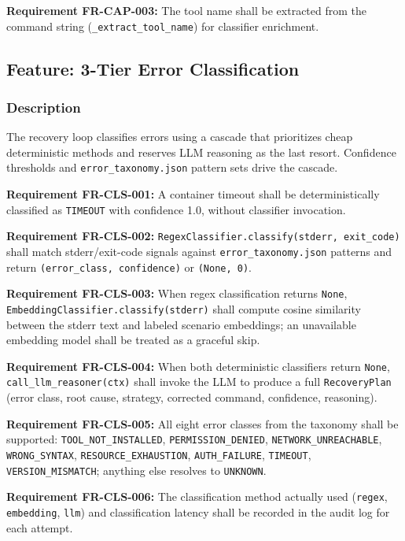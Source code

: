 \documentclass[10pt,journal,onecolumn]{IEEEtran}
\newcommand{\reqid}[1]{\textbf{#1}}
\begin{document}
\reqid{Requirement FR-CAP-003:} The tool name shall be extracted from the command string (\texttt{\_extract\_tool\_name}) for classifier enrichment.

\subsection{Feature: 3-Tier Error Classification}

\subsubsection{Description}

The recovery loop classifies errors using a cascade that prioritizes cheap deterministic methods and reserves LLM reasoning as the last resort. Confidence thresholds and \texttt{error\_taxonomy.json} pattern sets drive the cascade.

\reqid{Requirement FR-CLS-001:} A container timeout shall be deterministically classified as \texttt{TIMEOUT} with confidence 1.0, without classifier invocation.

\reqid{Requirement FR-CLS-002:} \texttt{RegexClassifier.\allowbreak classify(stderr, exit\_\allowbreak code)} shall match stderr/exit-code signals against \texttt{error\_taxonomy.json} patterns and return \texttt{(error\_\allowbreak class, confidence)} or \texttt{(None, 0)}.

\reqid{Requirement FR-CLS-003:} When regex classification returns \texttt{None}, \texttt{EmbeddingClassifier.\allowbreak classify(stderr)} shall compute cosine similarity between the stderr text and labeled scenario embeddings; an unavailable embedding model shall be treated as a graceful skip.

\reqid{Requirement FR-CLS-004:} When both deterministic classifiers return \texttt{None}, \texttt{call\_llm\_reasoner(ctx)} shall invoke the LLM to produce a full \texttt{RecoveryPlan} (error class, root cause, strategy, corrected command, confidence, reasoning).

\reqid{Requirement FR-CLS-005:} All eight error classes from the taxonomy shall be supported: \texttt{TOOL\_NOT\_INSTALLED}, \texttt{PERMISSION\_DENIED}, \texttt{NETWORK\_UNREACHABLE}, \texttt{WRONG\_SYNTAX}, \texttt{RESOURCE\_EXHAUSTION}, \texttt{AUTH\_FAILURE}, \texttt{TIMEOUT}, \texttt{VERSION\_MISMATCH}; anything else resolves to \texttt{UNKNOWN}.

\reqid{Requirement FR-CLS-006:} The classification method actually used (\texttt{regex}, \texttt{embedding}, \texttt{llm}) and classification latency shall be recorded in the audit log for each attempt.
\end{document}
